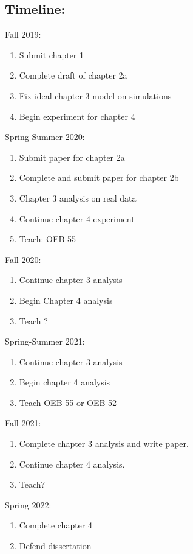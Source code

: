 \documentclass[11pt]{article}\usepackage[]{graphicx}\usepackage[]{color}
\begin{document}
\subsection*{Timeline:}
Fall 2019: 
\begin{enumerate}
\item Submit chapter 1
\item Complete draft of chapter 2a
\item Fix ideal chapter 3 model on simulations
\item Begin experiment for chapter 4
\end{enumerate}
Spring-Summer 2020:
\begin{enumerate}
\item Submit paper for chapter 2a
\item Complete and submit paper for chapter 2b
\item Chapter 3 analysis on real data
\item Continue chapter 4 experiment
\item Teach: OEB 55
\end{enumerate}
Fall 2020:
\begin{enumerate}
\item Continue chapter 3 analysis
\item Begin Chapter 4 analysis
\item Teach ?
\end {enumerate}
Spring-Summer 2021:
\begin{enumerate}
\item Continue chapter 3 analysis
\item Begin chapter 4 analysis
\item Teach OEB 55 or OEB 52
\end {enumerate}
Fall 2021:
\begin{enumerate}
\item Complete chapter 3 analysis and write paper.
\item Continue chapter 4 analysis.
\item Teach?
\end{enumerate}
Spring 2022:
\begin{enumerate}
\item Complete chapter 4
\item Defend dissertation
\end{enumerate}
\end{document}
